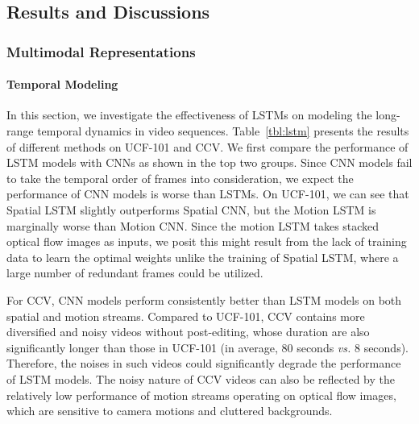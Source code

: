 \documentclass[journal]{IEEEtran}
\begin{document}
\subsection{Results and Discussions}
\subsubsection{Multimodal Representations}
\paragraph{Temporal Modeling} In this section, we investigate the effectiveness of LSTMs on modeling the long-range temporal dynamics in video sequences. Table~\ref{tbl:lstm} presents the results of different methods on UCF-101 and CCV. We first compare the performance of LSTM models with CNNs as shown in the top two groups. Since CNN models fail to take the temporal order of frames into consideration, we expect the performance of CNN models is worse than LSTMs. On UCF-101, we can see that Spatial LSTM slightly outperforms Spatial CNN, but the Motion LSTM is marginally worse than Motion CNN. Since the motion LSTM takes stacked optical flow images as inputs, we posit this might result from the lack of training data to learn the optimal weights unlike the training of Spatial LSTM, where a large number of redundant frames could be utilized.

For CCV, CNN models perform consistently better than LSTM models on both spatial and motion streams. Compared to UCF-101, CCV contains more diversified and noisy videos without post-editing, whose duration are also significantly longer than those in UCF-101 (in average, 80 seconds \textit{vs.} 8 seconds). Therefore, the noises in such videos could significantly degrade the performance of LSTM models. The noisy nature of CCV videos can also be reflected by the relatively low performance of motion streams operating on optical flow images, which are sensitive to camera motions and cluttered backgrounds.
\end{document}
